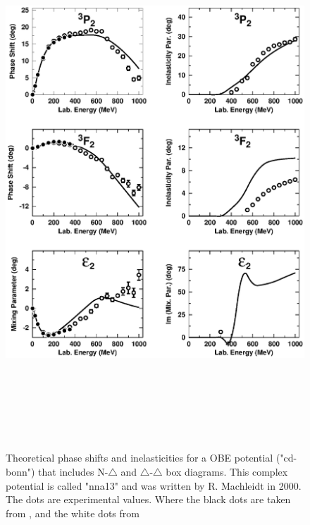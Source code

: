 \begin{figure}%
\includegraphics[height=20cm,width=18cm]{figd85_alt4.ps}
\caption{\label{fig:hiEnergy} Theoretical phase shifts and inelasticities for a OBE potential ("cd-bonn")
that includes N-$\triangle$ and $\triangle$-$\triangle$ box diagrams. This complex potential is called "nna13"
and was written by R. Machleidt in 2000. The dots are experimental values. Where the black dots are taken 
from \cite{PRC48faseskift350MeV}, and
the white dots from \cite{PRC62faseskift3GeV}}
\end{figure}
